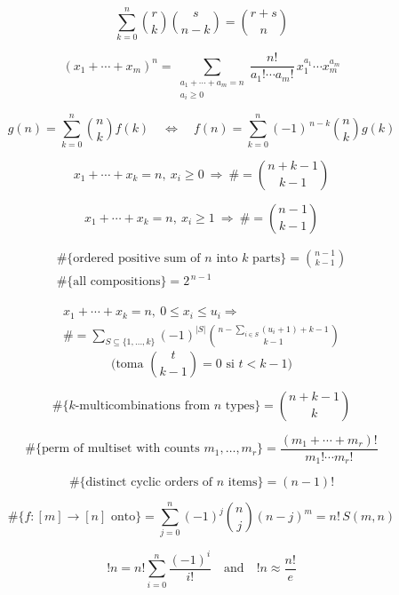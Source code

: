 
\[
\sum_{k=0}^{n} \binom{r}{k}\binom{s}{n-k}=\binom{r+s}{n}
\]

\[
(x_1+\cdots+x_m)^n=\sum_{\substack{a_1+\cdots+a_m=n\\a_i\ge 0}}
\frac{n!}{a_1!\cdots a_m!}\,x_1^{a_1}\cdots x_m^{a_m}
\]

\[
g(n)=\sum_{k=0}^{n}\binom{n}{k}f(k)
\quad\Longleftrightarrow\quad
f(n)=\sum_{k=0}^{n}(-1)^{\,n-k}\binom{n}{k}g(k)
\]

\[
x_1+\cdots+x_k=n,\ x_i\ge 0 \ \Rightarrow\ \#=\binom{n+k-1}{k-1}
\]

\[
x_1+\cdots+x_k=n,\ x_i\ge 1 \ \Rightarrow\ \#=\binom{n-1}{k-1}
\]

\begin{gather*}
\#\{\text{ordered positive sum of }n\text{ into }k\text{ parts}\}=\binom{n-1}{k-1}\\
\#\{\text{all compositions}\}=2^{\,n-1}
\end{gather*}

\begin{gather*}
x_1+\cdots+x_k=n,\ 0\le x_i\le u_i \Rightarrow\\
\#=\sum_{S\subseteq\{1,\dots,k\}} (-1)^{|S|}
\binom{n-\sum_{i\in S}(u_i+1)+k-1}{k-1}
\end{gather*}
\[
\text{(toma } \binom{t}{k-1}=0 \text{ si } t<k-1)
\]

\[
\#\{\text{$k$-multicombinations from $n$ types}\}=\binom{n+k-1}{k}
\]

\[
\#\{\text{perm of multiset with counts }m_1,\dots,m_r\}
=\frac{(m_1+\cdots+m_r)!}{m_1!\cdots m_r!}
\]

\[
\#\{\text{distinct cyclic orders of }n\text{ items}\}=(n-1)!
\]

\[
\#\{f:[m]\to[n]\text{ onto}\}
=\sum_{j=0}^{n}(-1)^j\binom{n}{j}(n-j)^{m}
= n!\,S(m,n)
\]

\[
!n=n!\sum_{i=0}^{n}\frac{(-1)^i}{i!}
\quad\text{and}\quad
!n\approx \frac{n!}{e}
\]

